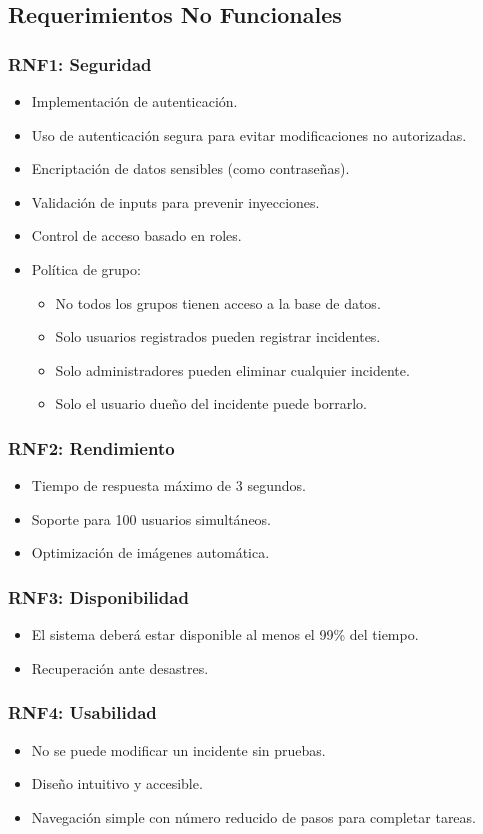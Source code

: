 \subsection{Requerimientos No Funcionales}

\subsubsection{RNF1: Seguridad}
\begin{itemize}
    \item Implementación de autenticación.
    \item Uso de autenticación segura para evitar modificaciones no autorizadas.
    \item Encriptación de datos sensibles (como contraseñas).
    \item Validación de inputs para prevenir inyecciones.
    \item Control de acceso basado en roles.
    \item Política de grupo:
    \begin{itemize}
        \item No todos los grupos tienen acceso a la base de datos.
        \item Solo usuarios registrados pueden registrar incidentes.
        \item Solo administradores pueden eliminar cualquier incidente.
        \item Solo el usuario dueño del incidente puede borrarlo.
    \end{itemize}
\end{itemize}

\subsubsection{RNF2: Rendimiento}
\begin{itemize}
    \item Tiempo de respuesta máximo de 3 segundos.
    \item Soporte para 100 usuarios simultáneos.
    \item Optimización de imágenes automática.
\end{itemize}

\subsubsection{RNF3: Disponibilidad}
\begin{itemize}
    \item El sistema deberá estar disponible al menos el 99\% del tiempo.
    \item Recuperación ante desastres.
\end{itemize}

\subsubsection{RNF4: Usabilidad}
\begin{itemize}
    \item No se puede modificar un incidente sin pruebas.
    \item Diseño intuitivo y accesible.
    \item Navegación simple con número reducido de pasos para completar tareas.
\end{itemize}
